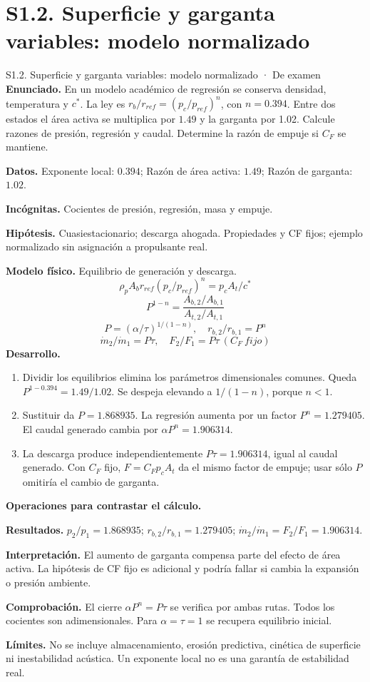 \section{S1.2. Superficie y garganta variables: modelo normalizado}
\begin{studiumworked}{S1.2. Superficie y garganta variables: modelo normalizado · De examen}
\textbf{Enunciado.} En un modelo académico de regresión se conserva densidad, temperatura y $c^*$. La ley es $r_b/r_{ref}=(p_c/p_{ref})^n$, con $n=0.394$. Entre dos estados el área activa se multiplica por $1.49$ y la garganta por 1.02. Calcule razones de presión, regresión y caudal. Determine la razón de empuje si $C_F$ se mantiene.

\textbf{Datos.} Exponente local: $0.394$; Razón de área activa: $1.49$; Razón de garganta: $1.02$.

\textbf{Incógnitas.} Cocientes de presión, regresión, masa y empuje.

\textbf{Hipótesis.} Cuasiestacionario; descarga ahogada. Propiedades y CF fijos; ejemplo normalizado sin asignación a propulsante real.

\textbf{Modelo físico.} Equilibrio de generación y descarga.
\[\rho_pA_br_{ref}(p_c/p_{ref})^n=p_cA_t/c^*\]
\[P^{1-n}=\frac{A_{b,2}/A_{b,1}}{A_{t,2}/A_{t,1}}\]
\[P=(\alpha/\tau)^{1/(1-n)},\quad r_{b,2}/r_{b,1}=P^n\]
\[\dot m_2/\dot m_1=P\tau,\quad F_2/F_1=P\tau\ (C_F\ fijo)\]
\textbf{Desarrollo.}
\begin{enumerate}
\item Dividir los equilibrios elimina los parámetros dimensionales comunes. Queda $P^{1-0.394}=1.49/1.02$. Se despeja elevando a $1/(1-n)$, porque $n<1$.
\item Sustituir da $P=1.868935$. La regresión aumenta por un factor $P^n=1.279405$. El caudal generado cambia por $\alpha P^n=1.906314$.
\item La descarga produce independientemente $P\tau=1.906314$, igual al caudal generado. Con $C_F$ fijo, $F=C_Fp_cA_t$ da el mismo factor de empuje; usar sólo $P$ omitiría el cambio de garganta.
\end{enumerate}
\textbf{Operaciones para contrastar el cálculo.}

\textbf{Resultados.} $p_2/p_1=1.868935$; $r_{b,2}/r_{b,1}=1.279405$; $\dot m_2/\dot m_1=F_2/F_1=1.906314$.

\textbf{Interpretación.} El aumento de garganta compensa parte del efecto de área activa. La hipótesis de CF fijo es adicional y podría fallar si cambia la expansión o presión ambiente.

\textbf{Comprobación.} El cierre $\alpha P^n=P\tau$ se verifica por ambas rutas. Todos los cocientes son adimensionales. Para $\alpha=\tau=1$ se recupera equilibrio inicial.

\textbf{Límites.} No se incluye almacenamiento, erosión predictiva, cinética de superficie ni inestabilidad acústica. Un exponente local no es una garantía de estabilidad real.
\end{studiumworked}
